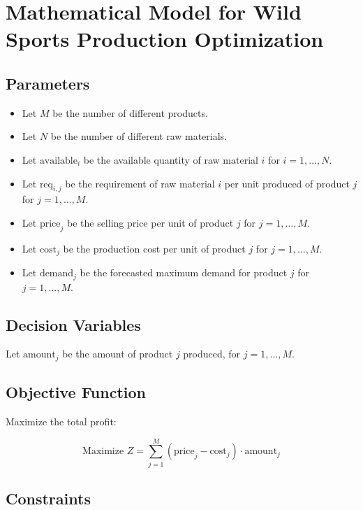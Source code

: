\documentclass{article}
\begin{document}
\section*{Mathematical Model for Wild Sports Production Optimization}

\subsection*{Parameters}

\begin{itemize}
    \item Let \( M \) be the number of different products.
    \item Let \( N \) be the number of different raw materials.
    \item Let \( \text{available}_i \) be the available quantity of raw material \( i \) for \( i = 1, \ldots, N \).
    \item Let \( \text{req}_{i,j} \) be the requirement of raw material \( i \) per unit produced of product \( j \) for \( j = 1, \ldots, M \).
    \item Let \( \text{price}_j \) be the selling price per unit of product \( j \) for \( j = 1, \ldots, M \).
    \item Let \( \text{cost}_j \) be the production cost per unit of product \( j \) for \( j = 1, \ldots, M \).
    \item Let \( \text{demand}_j \) be the forecasted maximum demand for product \( j \) for \( j = 1, \ldots, M \).
\end{itemize}

\subsection*{Decision Variables}

Let \( \text{amount}_j \) be the amount of product \( j \) produced, for \( j = 1, \ldots, M \).

\subsection*{Objective Function}

Maximize the total profit:

\[
\text{Maximize } Z = \sum_{j=1}^{M} (\text{price}_j - \text{cost}_j) \cdot \text{amount}_j
\]

\subsection*{Constraints}
\end{document}
